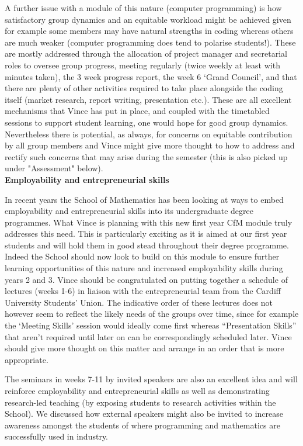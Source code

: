 \documentclass[a4paper,12pt]{article}
\begin{document}
A further issue with a module of this nature (computer programming) is how satisfactory group dynamics and an equitable workload might be achieved given for example some members may have natural strengths in coding whereas others are much weaker (computer programming does tend to polarise students!). These are mostly addressed through the allocation of project manager and secretarial roles to oversee group progress, meeting regularly (twice weekly at least with minutes taken), the 3 week progress report, the week 6 `Grand Council', and that there are plenty of other activities required to take place alongside the coding itself (market research, report writing, presentation etc.). These are all excellent mechanisms that Vince has put in place, and coupled with the timetabled sessions to support student learning, one would hope for good group dynamics. Nevertheless there is potential, as always, for concerns on equitable contribution by all group members and Vince might give more thought to how to address and rectify such concerns that may arise during the semester (this is also picked up under "Assessment" below).\\



\textbf{Employability and entrepreneurial skills}

In recent years the School of Mathematics has been looking at ways to embed employability and entrepreneurial skills into its undergraduate degree programmes. What Vince is planning with this new first year CfM module truly addresses this need. This is particularly exciting as it is aimed at our first year students and will hold them in good stead throughout their degree programme. Indeed the School should now look to build on this module to ensure further learning opportunities of this nature and increased employability skills during years 2 and 3.  Vince should be congratulated on putting together a schedule of lectures (weeks 1-6) in liaison with the entrepreneurial team from the Cardiff University Students’ Union.   The indicative order of these lectures does not however seem to reflect the likely needs of the groups over time, since for example the ‘Meeting Skills’ session would ideally come first whereas “Presentation Skills” that aren’t required until later on can be correspondingly scheduled later.   Vince should give more thought on this matter and arrange in an order that is more appropriate.

The seminars in weeks 7-11 by invited speakers are also an excellent idea and will reinforce employability and entrepreneurial skills as well as demonstrating research-led teaching (by exposing students to research activities within the School).  We discussed how external speakers might also be invited to increase awareness amongst the students of where programming and mathematics are successfully used in industry.
\end{document}

